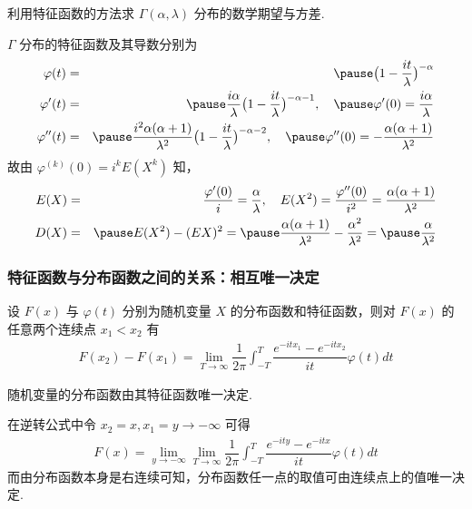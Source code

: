 \begin{frame}
	\begin{exam}
		利用特征函数的方法求 $\Gamma (\alpha,\lambda)$ 分布的数学期望与方差.
	\end{exam}

	\pause
	\jieda $\Gamma$ 分布的特征函数及其导数分别为
	\begin{eqnarray*}
		\varphi(t)&=&\pause \big(1-\dfrac{it}{\lambda}\big)^{-\alpha}\\
		\varphi'(t)&=&\pause \dfrac{i\alpha}{\lambda}\big(1-\dfrac{it}{\lambda}\big)^{-\alpha-1},\quad \pause \varphi'(0)=\dfrac{i\alpha}{\lambda}\\
		\varphi''(t)&=&\pause \dfrac{i^2\alpha(\alpha+1)}{\lambda^2}\big(1-\dfrac{it}{\lambda}\big)^{-\alpha-2}, \quad \pause \varphi''(0)=-\dfrac{\alpha(\alpha+1)}{\lambda^2}
	\end{eqnarray*}\pause
	故由 $\varphi^{(k)}(0)=i^kE (X^k)$ 知，\pause
	\begin{eqnarray*}
		E(X)&=&\dfrac{\varphi'(0)}{i}=\dfrac{\alpha}{\lambda},\quad E(X^2)=\dfrac{\varphi''(0)}{i^2}=\dfrac{\alpha(\alpha+1)}{\lambda^2}\\
		D(X)&=&\pause E(X^2)-(EX)^2=\pause \dfrac{\alpha(\alpha+1)}{\lambda^2}-\dfrac{\alpha^2}{\lambda^2}=\pause \dfrac{\alpha}{\lambda^2}
	\end{eqnarray*}

\end{frame}

\begin{frame}
	\frametitle{特征函数与分布函数之间的关系：相互唯一决定}
	\begin{thm}[逆转公式] 设 $F (x)$ 与 $\varphi (t)$ 分别为随机变量 $X$ 的分布函数和特征函数，则对 $F (x)$ 的任意两个连续点 $x_1<x_2$ 有
		\begin{eqnarray*}
			F(x_2)-F(x_1)=\lim_{T\rightarrow\infty}\dfrac{1}{2\pi}\int_{-T}^T\dfrac{e^{-itx_1}-e^{-itx_2}}{it}\varphi(t)dt
		\end{eqnarray*}
	\end{thm}
	\pause
	\begin{thm}[唯一性定理] 随机变量的分布函数由其特征函数唯一决定.
	\end{thm}

	\pause \zheng 在逆转公式中令 $x_2=x, x_1=y\rightarrow -\infty$ 可得
	\begin{eqnarray*}
		F(x)=\lim_{y\rightarrow-\infty}\lim_{T\rightarrow\infty}\dfrac{1}{2\pi}\int_{-T}^T\dfrac{e^{-ity}-e^{-itx}}{it}\varphi(t)dt
	\end{eqnarray*}
	\pause 而由分布函数本身是右连续可知，分布函数任一点的取值可由连续点上的值唯一决定.

\end{frame}

